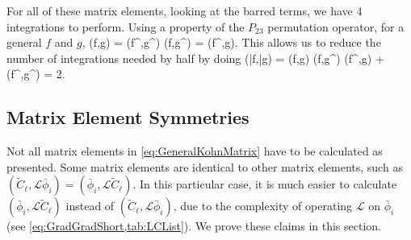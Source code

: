 \documentclass[Dissertation.tex]{subfiles}
\begin{document}
For all of these matrix elements, looking at the barred terms, we have 4 integrations to perform. Using a property of the $P_{23}$ permutation operator, for a general $f$ and $g$,
\beq
\label{eq:PermProp}
(f,g) = (f^\prime,g^\prime)  (f,g^\prime) = (f^\prime,g).
\eeq
This allows us to reduce the number of integrations needed by half by doing
\beq
\label{eq:PermPropFull}
(\bar{f},\bar{g}) = (f,g) \pm (f,g^\prime) \pm (f^\prime,g) + (f^\prime,g^\prime) = 2.
\eeq


\subsection{Matrix Element Symmetries}
\label{sec:Symmetries}

Not all matrix elements in \cref{eq:GeneralKohnMatrix} have to be calculated as presented. Some matrix elements are identical to other matrix elements, such as $(\widetilde{C}_\ell,\mathcal{L}\bar{\phi}_i) = (\bar{\phi}_i,\mathcal{L}\widetilde{C}_\ell)$. In this particular case, it is much easier to calculate $(\bar{\phi}_i,\mathcal{L}\widetilde{C}_\ell)$ instead of $(\widetilde{C}_\ell,\mathcal{L}\bar{\phi}_i)$, due to the complexity of operating $\mathcal{L}$ on $\bar{\phi}_i$ (see \cref{eq:GradGradShort,tab:LCList}). We prove these claims in this section.
\end{document}
